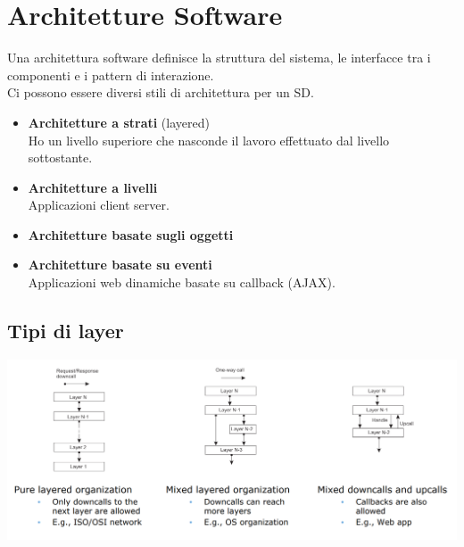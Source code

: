 \documentclass[12pt, a4paper]{article}
\begin{document}
    \section{Architetture Software}
    Una architettura software definisce la struttura del sistema,
    le interfacce tra i componenti e i pattern di interazione.
    \\
    Ci possono essere diversi stili di architettura per un SD.
    \begin{itemize}
        \item \textbf{Architetture a strati} (layered)\\Ho un livello superiore che nasconde
        il lavoro effettuato dal livello sottostante.
    \end{itemize}
    \begin{itemize}
        \item \textbf{Architetture a livelli}\\Applicazioni client server.
    \end{itemize}
    \begin{itemize}
        \item \textbf{Architetture basate sugli oggetti}
    \end{itemize}
    \begin{itemize}
        \item \textbf{Architetture basate su eventi}\\Applicazioni web dinamiche basate su callback (AJAX).
    \end{itemize}
    
    \subsection{Tipi di layer}

    \includegraphics[scale=0.32]{layered.png}
\end{document}
